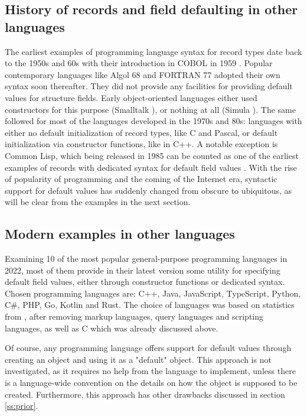 \documentclass[en]{pracamgr}
\begin{document}
\subsection{History of records and field defaulting in other languages}
The earliest examples of programming language syntax for record types date back to the 1950s and 60s with their introduction in COBOL in 1959 \cite{sebesta1996concepts}.
Popular contemporary languages like Algol 68 \cite{van2012revised} and FORTRAN 77 \cite{fortran77} adopted their own syntax soon thereafter.
They did not provide any facilities for providing default values for structure fields.
Early object-oriented languages either used constructors for this purpose (Smalltalk \cite{smalltalk80}), or nothing at all (Simula \cite{Simula67}).
The same followed for most of the languages developed in the 1970s and 80s: languages with either no default initialization of record types, like C and Pascal,
or default initialization via constructor functions, like in C++.
A notable exception is Common Lisp, which being released in 1985 can be counted 
as one of the earliest examples of records with dedicated syntax for default field values \cite{CommonLisp}.
With the rise of popularity of programming and the coming of the Internet era, 
syntactic support for default values has suddenly changed from obscure to ubiquitous, as will be clear from the examples in the next section.
\subsection{Modern examples in other languages}\label{subs:modernexamples}
Examining 10 of the most popular general-purpose programming languages in 2022,
most of them provide in their latest version some utility for specifying default field values,
either through constructor functions or dedicated syntax.
Chosen programming languages are: C++, Java, JavaScript, TypeScript, Python, C\#, PHP, Go, Kotlin and Rust.
The choice of languages was based on statistics from \cite{StatistaProgLangs}, after removing markup languages, 
query languages and scripting languages, as well as C which was already discussed above.

Of course, any programming language offers support for default values through creating an object and using it as a "default" object.
This approach is not investigated, as it requires no help from the language to implement, unless there is a language-wide
convention on the details on how the object is supposed to be created. Furthermore, this approach has other drawbacks discussed in section \ref{ss:prior}.
\end{document}
